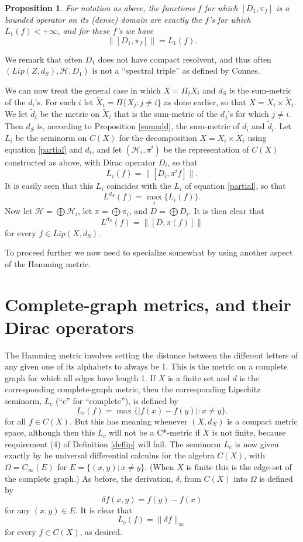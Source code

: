 \documentclass{amsart}[14pt]
\newtheorem{proposition}[theorem]{Proposition}
\theoremstyle{definition}
\theoremstyle{remark}
\newcommand{\cH}{{\mathcal H}}
\renewcommand{\d}{\delta}
\renewcommand{\O}{\Omega}
\newcommand{\<}{\langle}
\renewcommand{\>}{\rangle}
\numberwithin{equation}{section}
\begin{document}
{\begin{proposition}
\label{dir1}
For notation as above,
the functions $f$ for which
$[D_1, \pi_f]$ is a bounded operator on its (dense) domain are exactly
the $f$'s for which $L_1(f) < +\infty$, and for these $f$'s we have
\[
\|[D_1, \pi_f]\| = L_1(f)   .
\]
\end{proposition}

We remark that often $D_1$ does not have compact resolvent,  and
thus often $(Lip(Z, d_S), \cH, D_1)$ is not a ``spectral triple'' as 
defined by Connes. 

We can now treat the general case in which $X = \Pi_i X_i$ and
$d_S$ is the sum-metric of the $d_i$'s. For each $i$ let
$\tilde X_i = \Pi \{X_j: j \neq i\} $ as done earlier, 
so that $X = X_i \times \tilde X_i$.
We let $\tilde d_i$ be the metric on $\tilde X_i$ that is the sum-metric
of the $d_j$'s for which $j \neq i$. Then 
$d_S$ is, according to Proposition \ref{sumadd}, the sum-metric
of $d_i$ and $\tilde d_i$. Let $L_i$ be the 
seminorm on $C(X)$ for the decomposition $X = X_i \times \tilde X_i$
using equation \ref{partial} and $d_i$, and
let $(\cH_i, \pi^i)$
be the representation of $C(X)$ constructed as above, with
Dirac operator $D_i$, so that 
\[
L_i(f) = \|[D_i, \pi^i f]\|   .
\]
It is easily seen that 
this $L_i$ coincides with the $L_i$ of equation \ref{partial},
so that
\[
L^{d_S}(f) = \max_i\{ L_i(f)\}  .
\]
Now let $\cH = \bigoplus \cH_i$, let $\pi = \bigoplus \pi_i$,
and $D = \bigoplus D_i$. It is then clear that
\[  
L^{d_S}(f) = \| [D, \pi(f) ] \|  
\]
for every $f \in Lip(X, d_S)$.

To proceed further we now need to specialize somewhat 
by using another aspect of the Hamming metric.


\section{Complete-graph metrics, and their Dirac operators}
\label{seccomp}

The Hamming metric involves setting the distance between
the different letters of any given one of its 
alphabets to always be 1. This is
the metric on a complete graph for which all edges have
length 1. If $X$ is a finite set and $d$ is the corresponding
complete-graph metric, then the
corresponding Lipschitz seminorm, $L_c$ (``c'' for ``complete''), 
is defined by
\[
L_c(f) = \max \{|f(x)- f(y)|: x \neq y\}.
\] 
for all $f \in C(X)$. But this has meaning whenever $(X, d_X)$
is a compact metric space, although then this $L_c$ will not
be a C*-metric if $X$ is not finite, because requirement (4) of
Definition \ref{deflip} will fail. 
The seminorm $L_c$ is now given exactly by
he universal differential
calculus for the algebra $C(X)$, with $\O = C_\infty(E)$ for 
$
E = \{(x,y); x \neq y\}  .
$
(When $X$ is finite this is the edge-set of the complete graph.)
As before, the derivation, $\d$,
from $C(X)$ into $\O$ is defined by
\[
\d f(x,y)  = f(y) - f(x)  
\]
for any $(x,y) \in E$. 
It is clear that
\[
L_c(f) = \| \d f\|_\infty      
\]
for every $f \in C(X)$, as desired.

}
\end{document}

